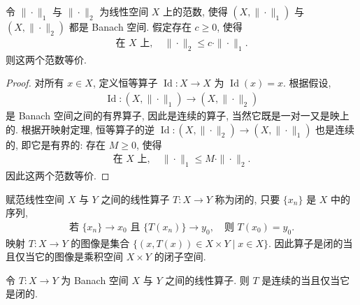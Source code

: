 \documentclass[../../main.tex]{subfiles}
\begin{document}
\begin{corollary}\label{corollary:ch13-范数等价}
令 $\|\cdot\|_{1}$ 与 $\|\cdot\|_{2}$ 为线性空间 $X$ 上的范数, 使得 $(X,\|\cdot\|_{1})$ 与 $(X,\|\cdot\|_{2})$ 都是 Banach 空间. 假定存在 $c\geqslant 0$, 使得
\begin{align*}
\text{在 }X\text{ 上},\quad\|\cdot\|_{2}\leqslant c\cdot\|\cdot\|_{1}.
\end{align*}
则这两个范数等价.
\end{corollary}

\begin{proof}
对所有 $x\in X$, 定义恒等算子 $\operatorname{Id}:X\to X$ 为 $\operatorname{Id}(x)=x$. 根据假设,
\begin{align*}
\operatorname{Id}:(X,\|\cdot\|_{1})\to(X,\|\cdot\|_{2})
\end{align*}
是 Banach 空间之间的有界算子, 因此是连续的算子, 当然它既是一对一又是映上的. 根据开映射定理, 恒等算子的逆 $\operatorname{Id}:(X,\|\cdot\|_{2})\to(X,\|\cdot\|_{1})$ 也是连续的, 即它是有界的: 存在 $M\geqslant 0$, 使得
\begin{align*}
\text{在 }X\text{ 上},\quad\|\cdot\|_{1}\leqslant M\cdot\|\cdot\|_{2}.
\end{align*}
因此这两个范数等价.
\end{proof}

\begin{definition}[闭算子]\label{definition:ch13-闭算子}
赋范线性空间 $X$ 与 $Y$ 之间的线性算子 $T:X\to Y$ 称为闭的, 只要 $\{x_{n}\}$ 是 $X$ 中的序列,
\begin{align*}
\text{若 }\{x_{n}\}\to x_{0}\text{ 且 }\{T(x_{n})\}\to y_{0},\quad\text{则 }T(x_{0})=y_{0}.
\end{align*}
映射 $T:X\to Y$ 的图像是集合 $\{(x,T(x))\in X\times Y\mid x\in X\}$. 因此算子是闭的当且仅当它的图像是乘积空间 $X\times Y$ 的闭子空间.
\end{definition}

\begin{theorem}[闭图像定理]\label{theorem:ch13-闭图像}
令 $T:X\to Y$ 为 Banach 空间 $X$ 与 $Y$ 之间的线性算子. 则 $T$ 是连续的当且仅当它是闭的.
\end{theorem}
\end{document}
